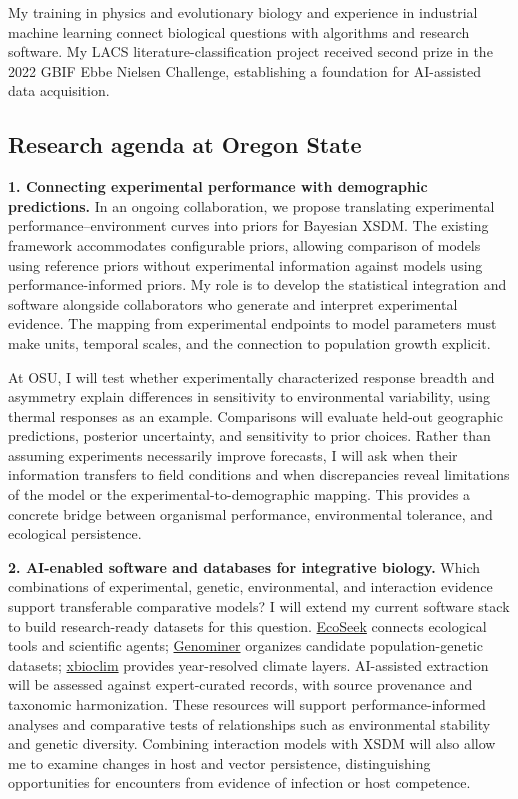 \documentclass[11pt,letterpaper]{article}
\begin{document}
My training in physics and evolutionary biology and experience in industrial machine learning connect biological questions with algorithms and research software. My LACS literature-classification project received second prize in the 2022 GBIF Ebbe Nielsen Challenge, establishing a foundation for AI-assisted data acquisition.

\subsection*{Research agenda at Oregon State}
\textbf{1. Connecting experimental performance with demographic predictions.}
In an ongoing collaboration, we propose translating experimental performance--environment curves into priors for Bayesian XSDM. The existing framework accommodates configurable priors, allowing comparison of models using reference priors without experimental information against models using performance-informed priors. My role is to develop the statistical integration and software alongside collaborators who generate and interpret experimental evidence. The mapping from experimental endpoints to model parameters must make units, temporal scales, and the connection to population growth explicit.

At OSU, I will test whether experimentally characterized response breadth and asymmetry explain differences in sensitivity to environmental variability, using thermal responses as an example. Comparisons will evaluate held-out geographic predictions, posterior uncertainty, and sensitivity to prior choices. Rather than assuming experiments necessarily improve forecasts, I will ask when their information transfers to field conditions and when discrepancies reveal limitations of the model or the experimental-to-demographic mapping. This provides a concrete bridge between organismal performance, environmental tolerance, and ecological persistence.

\textbf{2. AI-enabled software and databases for integrative biology.}
Which combinations of experimental, genetic, environmental, and interaction evidence support transferable comparative models? I will extend my current software stack to build research-ready datasets for this question. \href{https://ecoseek.org}{EcoSeek} connects ecological tools and scientific agents; \href{https://genominer.ecoseek.org}{Genominer} organizes candidate population-genetic datasets; \href{https://xbioclim.org}{xbioclim} provides year-resolved climate layers. AI-assisted extraction will be assessed against expert-curated records, with source provenance and taxonomic harmonization. These resources will support performance-informed analyses and comparative tests of relationships such as environmental stability and genetic diversity. Combining interaction models with XSDM will also allow me to examine changes in host and vector persistence, distinguishing opportunities for encounters from evidence of infection or host competence.
\end{document}
